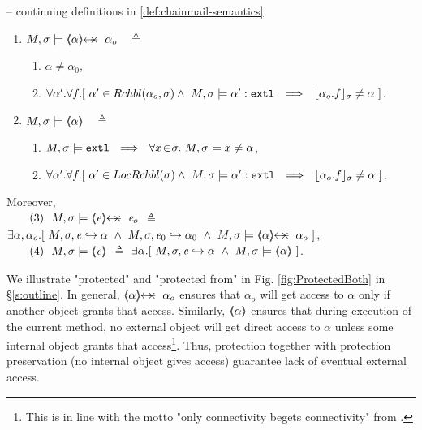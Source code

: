  
\begin{definition} 
\label{def:chainmail-protection-from}
\label{sect:semantics:assert:prtFrom}
 \label{def:chainmail-protection}
-- continuing definitions in \ref{def:chainmail-semantics}:
\begin{enumerate}
\item
\label{cProtected}
 $\satisfiesA{M}{\sigma}{\protectedFrom{{\alpha}} {{\alpha_{o}}}}   \ \ \ \triangleq $ 
  \begin{enumerate}
 \item
$\alpha\neq \alpha_0$,
 \item
$\forall \alpha'.\forall f.[\ \alpha' \in {\ensuremath{Rchbl(\alpha_o,\sigma)}} \wedge\   M , \sigma \models \alpha':\mbox{\normalfont{\texttt{extl}}} 
\ \ \Longrightarrow \ \  
  \lfloor \alpha_o.f \rfloor_{\sigma} \neq \alpha     \ ] $.
\end{enumerate}
\item
\label{sect:semantics:assert:prt}
$\satisfiesA{M}{\sigma} {\inside {\alpha}}  \ \ \ \triangleq \ \ \   $
 \begin{enumerate}
\item
 $\satisfiesA{M}{\sigma}{\extThis}\ \ \Longrightarrow\ \ \forall x\!\in\! \sigma.\ \satisfiesA{M}{\sigma}{x\neq \alpha}$,
 \item
$\forall \alpha'.\forall f.[\ \alpha' \in {\ensuremath{LocRchbl(\sigma)}} \wedge\   M , \sigma \models \alpha':\mbox{\normalfont{\texttt{extl}}} 
\ \ \Longrightarrow \ \  
  \lfloor \alpha_o.f \rfloor_{\sigma} \neq \alpha     \ ] $.
  \end{enumerate}
\end{enumerate}
Moreover,  \\
$\strut \ \ \ \ \ \  (3) \ \  \satisfiesA{M}{\sigma}{\protectedFrom{{\re}} {{\re_{o}}}}$ $ \triangleq$
$\exists \alpha, \alpha_{o}. [\  \eval{M}{\sigma}{{\re}}{\alpha}\ \wedge\ \eval{M}{\sigma}{{\re_0}}{\alpha_0} \  \wedge \ 
  \satisfiesA{M}{\sigma}{\protectedFrom{{\alpha}} {{\alpha_{o}}}}\   ]$, \\
  $\strut \ \ \ \ \ \ (4) \ \ \satisfiesA{M}{\sigma}{\inside{\re}}$  $\triangleq$
 $\exists \alpha. [\   M, \sigma, {\mathit{e}} \hookrightarrow \alpha\ \wedge \   M , \sigma \models \langle\!\!\langle \alpha \rangle\!\!\rangle \  ]$. 

 \end{definition} 
 
 We illustrate "protected" and "protected from" in Fig.  \ref{fig:ProtectedBoth} in \S \ref{s:outline}.
%
In general,  $\protectedFrom{{\alpha}} {{\alpha_{o}}}$ ensures that $\alpha_o$ will get access to $\alpha$ only if another object 
 grants that access.
Similarly, $\langle\!\!\langle \alpha \rangle\!\!\rangle$ ensures that during execution of the current method, no external object will get direct access to $\alpha$ unless some internal object grants that access\footnote{This is in line with the motto "only connectivity begets connectivity" from \cite{MillerPhD}.}.
Thus, protection together with protection preservation  (\ie no internal object gives access) guarantee
lack of eventual external access.  

